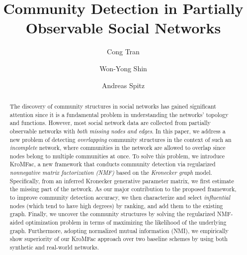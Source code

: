 \documentclass[format=acmsmall, review=false, screen=true]{acmart}
\begin{document}
\title[Community Detection in Partially Observable Social Networks]{Community Detection in Partially Observable Social Networks}
\author{Cong Tran}

\author{Won-Yong Shin}

\author{Andreas Spitz}
\begin{abstract}
The discovery of community structures in social networks has gained significant attention since it is a fundamental problem in understanding the networks' topology and functions. However, most social network data are collected from partially observable networks with {\em both missing nodes and edges}. In this paper, we address a new problem of detecting {\em overlapping} community structures in the context of such an {\em incomplete} network, where communities in the network are allowed to overlap since nodes belong to multiple communities at once. To solve this problem, we introduce \textsf{KroMFac}, a new framework that conducts community detection via regularized {\em nonnegative matrix factorization (NMF)} based on the {\em Kronecker graph} model. Specifically, from an inferred Kronecker generative parameter matrix, we first estimate the missing part of the network. As our major contribution to the proposed framework, to improve community detection accuracy, we then characterize and select {\em influential} nodes (which tend to have high degrees) by ranking, and add them to the existing graph. Finally, we uncover the community structures by solving the regularized NMF-aided optimization problem in terms of maximizing the likelihood of the underlying graph. Furthermore, adopting normalized mutual information (NMI), we empirically show superiority of our \textsf{KroMFac} approach over two baseline schemes by using both synthetic and real-world networks.
\end{abstract}
\end{document}

